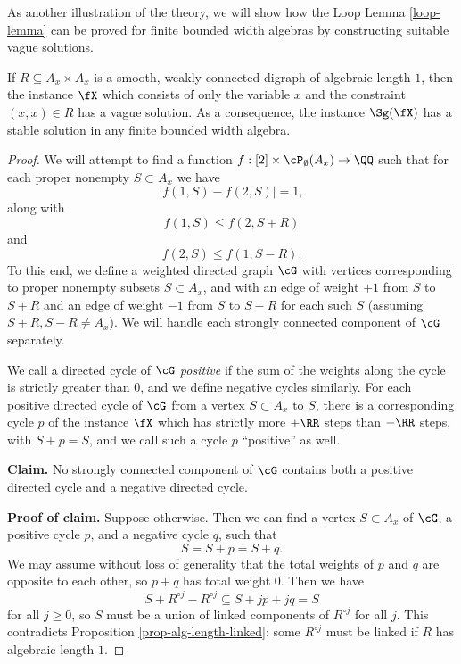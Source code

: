 As another illustration of the theory, we will show how the Loop Lemma \ref{loop-lemma} can be proved for finite bounded width algebras by constructing suitable vague solutions.

\begin{thm} If $R \subseteq A_x \times A_x$ is a smooth, weakly connected digraph of algebraic length $1$, then the instance $\fX$ which consists of only the variable $x$ and the constraint $(x,x) \in R$ has a vague solution. As a consequence, the instance $\Sg(\fX)$ has a stable solution in any finite bounded width algebra.
\end{thm}
\begin{proof} We will attempt to find a function $f : [2] \times \cP_\emptyset(A_x) \rightarrow \QQ$ such that for each proper nonempty $S \subset A_x$ we have
\[
|f(1,S) - f(2,S)| = 1,
\]
along with
\[
f(1,S) \le f(2,S+R)
\]
and
\[
f(2,S) \le f(1,S-R).
\]
To this end, we define a weighted directed graph $\cG$ with vertices corresponding to proper nonempty subsets $S \subset A_x$, and with an edge of weight $+1$ from $S$ to $S+R$ and an edge of weight $-1$ from $S$ to $S-R$ for each such $S$ (assuming $S+R, S-R \ne A_x$). We will handle each strongly connected component of $\cG$ separately.

We call a directed cycle of $\cG$ \emph{positive} if the sum of the weights along the cycle is strictly greater than $0$, and we define negative cycles similarly. For each positive directed cycle of $\cG$ from a vertex $S \subset A_x$ to $S$, there is a corresponding cycle $p$ of the instance $\fX$ which has strictly more $+\RR$ steps than $-\RR$ steps, with $S+p = S$, and we call such a cycle $p$ ``positive'' as well.

{\bf Claim.} No strongly connected component of $\cG$ contains both a positive directed cycle and a negative directed cycle.

{\bf Proof of claim.} Suppose otherwise. Then we can find a vertex $S \subset A_x$ of $\cG$, a positive cycle $p$, and a negative cycle $q$, such that
\[
S = S+p = S+q.
\]
We may assume without loss of generality that the total weights of $p$ and $q$ are opposite to each other, so $p+q$ has total weight $0$. Then we have
\[
S + R^{\circ j} - R^{\circ j} \subseteq S + jp + jq = S
\]
for all $j \ge 0$, so $S$ must be a union of linked components of $R^{\circ j}$ for all $j$. This contradicts Proposition \ref{prop-alg-length-linked}: some $R^{\circ j}$ must be linked if $R$ has algebraic length $1$.


\end{proof}
